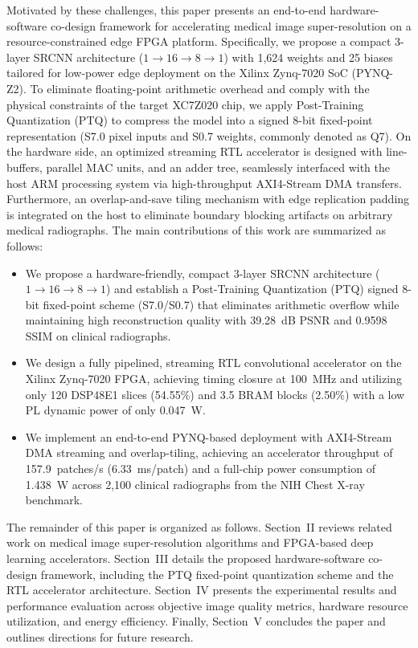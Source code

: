 \documentclass[conference]{IEEEtran}
\begin{document}
Motivated by these challenges, this paper presents an end-to-end hardware-software co-design framework for accelerating medical image super-resolution on a resource-constrained edge FPGA platform. Specifically, we propose a compact 3-layer SRCNN architecture ($1 \rightarrow 16 \rightarrow 8 \rightarrow 1$) with 1,624 weights and 25 biases tailored for low-power edge deployment on the Xilinx Zynq-7020 SoC (PYNQ-Z2). To eliminate floating-point arithmetic overhead and comply with the physical constraints of the target XC7Z020 chip, we apply Post-Training Quantization (PTQ) to compress the model into a signed 8-bit fixed-point representation (S7.0 pixel inputs and S0.7 weights, commonly denoted as Q7). On the hardware side, an optimized streaming RTL accelerator is designed with line-buffers, parallel MAC units, and an adder tree, seamlessly interfaced with the host ARM processing system via high-throughput AXI4-Stream DMA transfers. Furthermore, an overlap-and-save tiling mechanism with edge replication padding is integrated on the host to eliminate boundary blocking artifacts on arbitrary medical radiographs. The main contributions of this work are summarized as follows:
\begin{itemize}
    \item We propose a hardware-friendly, compact 3-layer SRCNN architecture ($1 \rightarrow 16 \rightarrow 8 \rightarrow 1$) and establish a Post-Training Quantization (PTQ) signed 8-bit fixed-point scheme (S7.0/S0.7) that eliminates arithmetic overflow while maintaining high reconstruction quality with 39.28~dB PSNR and 0.9598 SSIM on clinical radiographs.
    \item We design a fully pipelined, streaming RTL convolutional accelerator on the Xilinx Zynq-7020 FPGA, achieving timing closure at 100~MHz and utilizing only 120 DSP48E1 slices (54.55\%) and 3.5 BRAM blocks (2.50\%) with a low PL dynamic power of only 0.047~W.
    \item We implement an end-to-end PYNQ-based deployment with AXI4-Stream DMA streaming and overlap-tiling, achieving an accelerator throughput of 157.9~patches/s (6.33~ms/patch) and a full-chip power consumption of 1.438~W across 2,100 clinical radiographs from the NIH Chest X-ray benchmark.
\end{itemize}

The remainder of this paper is organized as follows. Section~II reviews related work on medical image super-resolution algorithms and FPGA-based deep learning accelerators. Section~III details the proposed hardware-software co-design framework, including the PTQ fixed-point quantization scheme and the RTL accelerator architecture. Section~IV presents the experimental results and performance evaluation across objective image quality metrics, hardware resource utilization, and energy efficiency. Finally, Section~V concludes the paper and outlines directions for future research.



\end{document}
